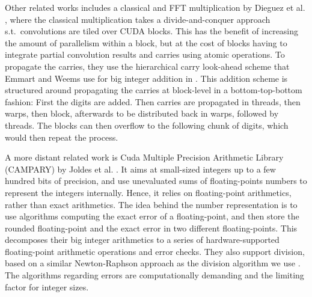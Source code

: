 Other related works includes a classical and FFT multiplication by Dieguez et
al. \cite{doi:10.1177/10943420221077964}, where the classical multiplication
takes a divide-and-conquer approach s.t.\ convolutions are tiled over CUDA
blocks. This has the benefit of increasing the amount of parallelism within a
block, but at the cost of blocks having to integrate partial convolution results
and carries using atomic operations. To propagate the carries, they use the
hierarchical carry look-ahead scheme that Emmart and Weems use for big integer
addition in \cite{Emmart2010HighPI}. This addition scheme is structured around
propagating the carries at block-level in a bottom-top-bottom fashion: First the
digits are added. Then carries are propagated in threads, then warps, then
block, afterwards to be distributed back in warps, followed by threads. The
blocks can then overflow to the following chunk of digits, which would then
repeat the process.

A more distant related work is Cuda Multiple Precision Arithmetic Library
(CAMPARY) by Joldes et al. \cite{Joldes2016CAMPARYCM}. It aims at small-sized
integers up to a few hundred bits of precision, and use unevaluated sums of
floating-points numbers to represent the integers internally. Hence, it relies
on floating-point arithmetics, rather than exact arithmetics. The idea behind
the number representation is to use algorithms computing the exact error of a
floating-point, and then store the rounded floating-point and the exact error in
two different floating-points. This decomposes their big integer arithmetics to
a series of hardware-supported floating-point arithmetic operations and error
checks. They also support division, based on a similar Newton-Raphson approach
as the division algorithm we use \cite{watt2023efficient}. The algorithms
regarding errors are computationally demanding and the limiting factor for
integer sizes.

